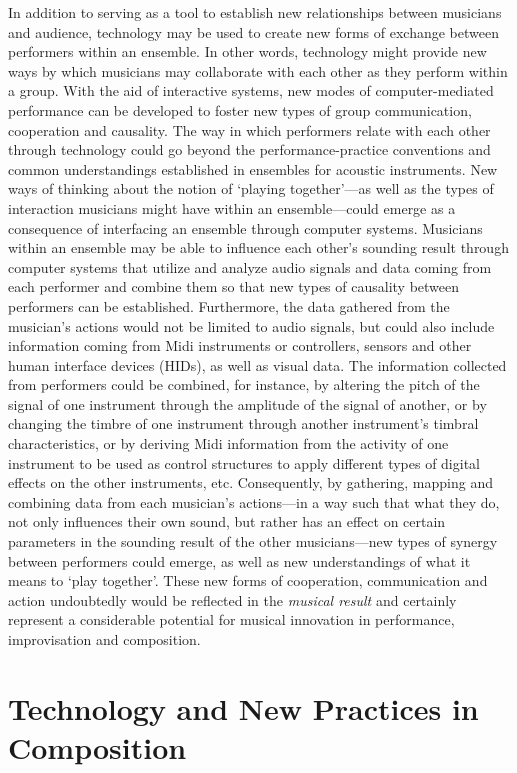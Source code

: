 In addition to serving as a tool to establish new relationships between musicians and audience, technology may be used to create new forms of exchange between performers within an ensemble. In other words, technology might provide new ways by which musicians may collaborate with each other as they perform within a group. With the aid of interactive systems, new modes of computer-mediated performance can be developed to foster new types of group communication, cooperation and causality. The way in which performers relate with each other through technology could go beyond the performance-practice conventions and common understandings established in ensembles for acoustic instruments. New ways of thinking about the notion of `playing together'---as well as the types of interaction musicians might have within an ensemble---could emerge as a consequence of interfacing an ensemble through computer systems. Musicians within an ensemble may be able to influence each other's sounding result through computer systems that utilize and analyze audio signals and data coming from each performer and combine them so that new types of causality between performers can be established. Furthermore, the data gathered from the musician's actions would not be limited to audio signals, but could also include information coming from Midi instruments or controllers, sensors and other human interface devices (HIDs), as well as visual data. The information collected from performers could be combined, for instance, by altering the pitch of the signal of one instrument through the amplitude of the signal of another, or by changing the timbre of one instrument through another instrument's timbral characteristics, or by deriving Midi information from the activity of one instrument to be used as control structures to apply different types of digital effects on the other instruments, etc. Consequently, by gathering, mapping and combining data from each musician's actions---in a way such that what they do, not only influences their own sound, but rather has an effect on certain parameters in the sounding result of the other musicians---new types of synergy between performers could emerge, as well as new understandings of what it means to `play together'. These new forms of cooperation, communication and action undoubtedly would be reflected in the \emph{musical result} and certainly represent a considerable potential for musical innovation in performance, improvisation and composition.

\hypertarget{techcomp}{}
\section{Technology and New Practices in Composition}

